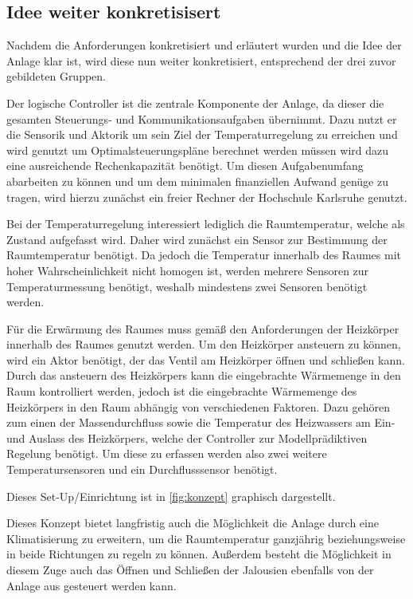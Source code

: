 \subsection{Idee weiter konkretisisert}


Nachdem die Anforderungen konkretisiert und erläutert wurden und die Idee der Anlage klar ist, wird diese nun weiter konkretisiert, entsprechend der drei zuvor gebildeten Gruppen.

Der logische Controller ist die zentrale Komponente der Anlage, da dieser die gesamten Steuerungs- und Kommunikationsaufgaben übernimmt. Dazu nutzt er die Sensorik und Aktorik um sein Ziel der Temperaturregelung zu erreichen und wird genutzt um  Optimalsteuerungspläne berechnet werden müssen wird dazu eine ausreichende Rechenkapazität benötigt. Um diesen Aufgabenumfang abarbeiten zu können und um dem minimalen finanziellen Aufwand genüge zu tragen, wird hierzu zunächst ein freier Rechner der Hochschule Karlsruhe genutzt.

Bei der Temperaturregelung interessiert lediglich die Raumtemperatur, welche als Zustand aufgefasst wird. Daher wird zunächst ein Sensor zur Bestimmung der Raumtemperatur benötigt. Da jedoch die Temperatur innerhalb des Raumes mit hoher Wahrscheinlichkeit nicht homogen ist, werden mehrere Sensoren zur Temperaturmessung benötigt, weshalb mindestens zwei Sensoren benötigt werden.

Für die Erwärmung des Raumes muss gemäß den Anforderungen der Heizkörper innerhalb des Raumes genutzt werden. Um den Heizkörper ansteuern zu können, wird ein Aktor benötigt, der das Ventil am Heizkörper öffnen und schließen kann. 
Durch das ansteuern des Heizkörpers kann die eingebrachte Wärmemenge in den Raum kontrolliert werden, jedoch ist die eingebrachte Wärmemenge des Heizkörpers in den Raum abhängig von verschiedenen Faktoren. Dazu gehören zum einen der Massendurchfluss sowie die Temperatur des Heizwassers am Ein- und Auslass des Heizkörpers, welche der Controller zur Modellprädiktiven Regelung benötigt. Um diese zu erfassen werden also zwei weitere Temperatursensoren und ein Durchflusssensor benötigt.

Dieses Set-Up/Einrichtung ist in \ref{fig:konzept} graphisch dargestellt.

Dieses Konzept bietet langfristig auch die Möglichkeit die Anlage durch eine Klimatisierung zu erweitern, um die Raumtemperatur ganzjährig beziehungsweise in beide Richtungen zu regeln zu können. Außerdem besteht die Möglichkeit in diesem Zuge auch das Öffnen und Schließen der Jalousien ebenfalls von der Anlage aus gesteuert werden kann.

